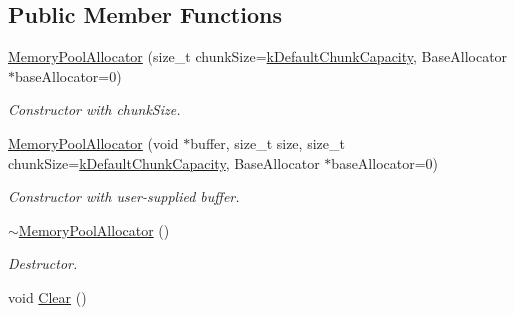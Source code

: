 \subsection*{Public Member Functions}
\begin{DoxyCompactItemize}
\item 
\hyperlink{class_memory_pool_allocator_aeec85ac657f242ac5620115141be5209}{Memory\+Pool\+Allocator} (size\+\_\+t chunk\+Size=\hyperlink{class_memory_pool_allocator_aa6db3ea4fb9c40174d77b3fe9b1cccf1}{k\+Default\+Chunk\+Capacity}, Base\+Allocator $\ast$base\+Allocator=0)
\begin{DoxyCompactList}\small\item\em Constructor with chunk\+Size. \end{DoxyCompactList}\item 
\hyperlink{class_memory_pool_allocator_a1f0d865093fdb955d956b7a445a8ddbf}{Memory\+Pool\+Allocator} (void $\ast$buffer, size\+\_\+t size, size\+\_\+t chunk\+Size=\hyperlink{class_memory_pool_allocator_aa6db3ea4fb9c40174d77b3fe9b1cccf1}{k\+Default\+Chunk\+Capacity}, Base\+Allocator $\ast$base\+Allocator=0)
\begin{DoxyCompactList}\small\item\em Constructor with user-\/supplied buffer. \end{DoxyCompactList}\item 
\hyperlink{class_memory_pool_allocator_ad4eee0ef3cfe8cda31034fbce98b7a9b}{$\sim$\+Memory\+Pool\+Allocator} ()
\begin{DoxyCompactList}\small\item\em Destructor. \end{DoxyCompactList}\item 
void \hyperlink{class_memory_pool_allocator_a57bbc80e570db6110901b9a7e36dbda0}{Clear} ()\hypertarget{class_memory_pool_allocator_a57bbc80e570db6110901b9a7e36dbda0}{}\label{class_memory_pool_allocator_a57bbc80e570db6110901b9a7e36dbda0}


\end{DoxyCompactItemize}
